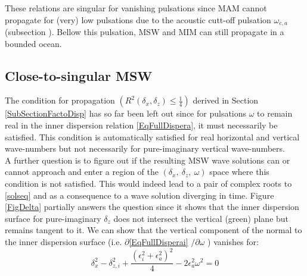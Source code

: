 \documentclass[a4paper,11pt]{article}
\begin{document}
These relations are singular for vanishing pulsations since MAM cannot propagate for (very) low pulsations due to the acoustic cutt-off pulsation $\omega_{c,a}$ (subsection ). Bellow this pulsation, MSW and MIM can still propagate in a bounded ocean.




\subsection{Close-to-singular MSW}

The condition for propagation $(\displaystyle R^2(\delta_x,\delta_z)\le \frac{1}{4})$ derived in Section \ref{SubSectionFactoDisp} has so far been left out since for pulsations $\omega$ to remain real in the inner dispersion relation \ref{EqFullDispera}, it must necessarily be satisfied.  This condition is automatically satisfied for real horizontal and vertical wave-numbers but not necessarily for pure-imaginary vertical wave-numbers.\\
A further question is to figure out if the resulting MSW wave solutions can or cannot approach and enter a region of the $(\delta_x,\ \delta_z,\ \omega)$ space where this condition is not satisfied. This would indeed lead to a pair of complex roots to \ref{solseq} and as a consequence to a wave solution diverging in time. Figure \ref{FigDelta} partially answers the question since it shows that the inner dispersion surface for pure-imaginary $\delta_z$ does not intersect the vertical (green) plane but remains tangent to it. We can show that the vertical component of the normal to the inner dispersion surface (i.e. $\partial$\ref{EqFullDisperai} $/\partial \omega$ ) vanishes for:
\begin{equation}
		\label{EqTurnPoints}
		 \delta_x^2 - \delta_{z,i} ^2 
		+\frac{(\epsilon_i^2+\epsilon_a^2)^2}{4}
		-2 \epsilon_a^2 \omega^2 = 0
\end{equation}
	
\end{document}
